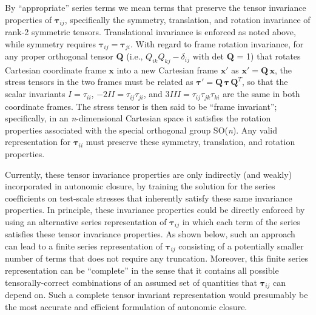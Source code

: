 By ``appropriate'' series terms we mean terms that preserve the tensor invariance properties of  $\mathbf{\tau}_{ij}$, specifically the symmetry, translation, and rotation invariance of rank-2 symmetric tensors.  Translational invariance is enforced as noted above, while symmetry requires  $\mathbf{\tau}_{ij} = \mathbf{\tau}_{ji}$.  With regard to frame rotation invariance, for any proper orthogonal tensor $\mathbf{Q}$ (i.e., $Q_{ik}Q_{kj} - \delta_{ij}$   with det $\mathbf{Q}$ = 1) that rotates Cartesian coordinate frame $\mathbf{x}$ into a new Cartesian frame $\mathbf{x'}$  as $\mathbf{x'} = \mathbf{Q\,x}$, the stress tensors in the two frames must be related as $\mathbf{\tau'} = \mathbf{Q \,\tau \, Q}^{T}$, so that the scalar invariants $I = \tau_{ii}$, $-2II = \tau_{ij}\tau_{ji}$, and $3III = \tau_{ij}\tau_{jk}\tau_{ki}$  are the same in both coordinate frames.  The stress tensor is then said to be ``frame invariant''; specifically, in an \textit{n}-dimensional Cartesian space it satisfies the rotation properties associated with the special orthogonal group SO(\textit{n}).  Any valid representation for $\mathbf{\tau}_{ii}$  must preserve these symmetry, translation, and rotation properties.

Currently, these tensor invariance properties are only indirectly (and weakly) incorporated in autonomic closure, by training the solution for the series coefficients on test-scale stresses that inherently satisfy these same invariance properties. In principle, these invariance properties could be directly enforced by using an alternative series representation of $\mathbf{\tau}_{ij}$  in which each term of the series satisfies these tensor invariance properties. As shown below, such an approach can lead to a finite series representation of $\mathbf{\tau}_{ij}$  consisting of a potentially smaller number of terms that does not require any truncation. Moreover, this finite series representation can be “complete” in the sense that it contains all possible tensorally-correct combinations of an assumed set of quantities that $\mathbf{\tau}_{ij}$  can depend on. Such a complete tensor invariant representation would presumably be the most accurate and efficient formulation of autonomic closure.

